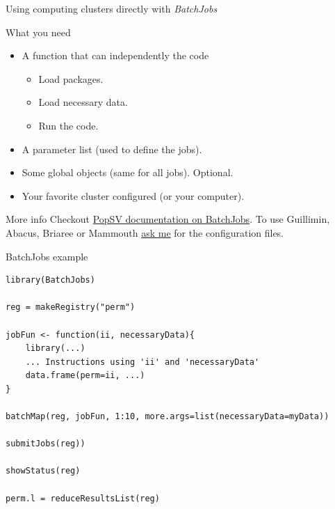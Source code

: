 \documentclass[10pt]{beamer}
\begin{document}
\begin{frame}{Using computing clusters directly with {\it BatchJobs}}
  \begin{block}{What you need}
    \begin{itemize}
    \item A function that can independently the code
      \begin{itemize}
      \item Load packages.
      \item Load necessary data.
      \item Run the code.
      \end{itemize}
    \item A parameter list (used to define the jobs).
    \item Some global objects (same for all jobs). Optional.
    \item Your favorite cluster configured (or your computer).
    \end{itemize}
  \end{block}
  \begin{block}{More info}
    Checkout \href{http://jmonlong.github.io/PopSV//2-ClusterManagement.md/}{PopSV documentation on BatchJobs}. To use Guillimin, Abacus, Briaree or Mammouth \href{mailto:jean.monlong@mail.mcgill.ca}{ask me} for the configuration files.
  \end{block}
\end{frame}

\begin{frame}[fragile]{BatchJobs example}

  \begin{lstlisting}
library(BatchJobs)

reg = makeRegistry("perm")

jobFun <- function(ii, necessaryData){
    library(...)
    ... Instructions using 'ii' and 'necessaryData'
    data.frame(perm=ii, ...)
}

batchMap(reg, jobFun, 1:10, more.args=list(necessaryData=myData))

submitJobs(reg))

showStatus(reg)

perm.l = reduceResultsList(reg)
  \end{lstlisting}

\end{frame}
\end{document}
